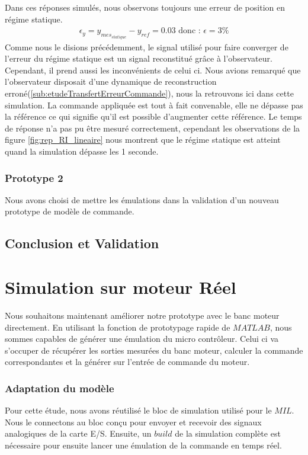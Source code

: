 		Dans ces réponses simulés, nous observons toujours une erreur de position en régime statique.
\begin{align*}\label{eqn:erreurML_RI}
\epsilon_y = y_{mes_{statique}} - y_{ref} = 0.03 \text{ donc : }\epsilon = 3\%
\end{align*}
Comme nous le disions précédemment, le signal utilisé pour faire converger de l'erreur du régime statique est un signal reconstitué grâce à l'observateur. Cependant, il prend aussi les inconvénients de celui ci. Nous avions remarqué que l'observateur disposait d'une dynamique de reconstruction erroné(\ref{sub:etudeTransfertErreurCommande}), nous la retrouvons ici dans cette simulation.
		La commande appliquée est tout à fait convenable, elle ne dépasse pas la référence ce qui signifie qu'il est possible d'augmenter cette référence. Le temps de réponse n'a pas pu être mesuré correctement, cependant les observations de la figure \ref{fig:rep_RI_lineaire} nous montrent que le régime statique est atteint quand la simulation dépasse les 1 seconde.
		\subsubsection{Prototype 2}
		Nous avons choisi de mettre les émulations dans la validation d'un nouveau prototype de modèle de commande.
		\subsection{Conclusion et Validation}
	\section{Simulation sur moteur Réel}
		Nous souhaitons maintenant améliorer notre prototype avec le banc moteur directement. En utilisant la fonction de prototypage rapide de $MATLAB$, nous sommes capables de générer une émulation du micro contrôleur. Celui ci va s'occuper de récupérer les sorties mesurées du banc moteur, calculer la commande correspondantes et la générer sur l'entrée de commande du moteur. 
		\subsubsection{Adaptation du modèle}
		Pour cette étude, nous avons réutilisé le bloc de simulation utilisé pour le $MIL$. Nous le connectons au bloc conçu pour envoyer et recevoir des signaux analogiques de la carte E/S. Ensuite, un $build$ de la simulation complète est nécessaire pour ensuite lancer une émulation de la commande en temps réel.
